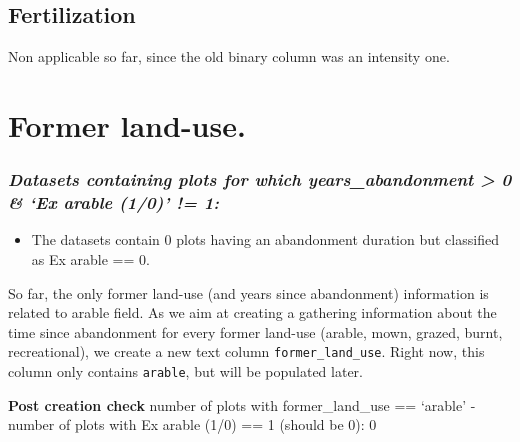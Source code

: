 \documentclass[table]{article}
\newenvironment{Shaded}{\begin{snugshade}}{\end{snugshade}}
\newcommand{\KeywordTok}[1]{\textcolor[rgb]{0.13,0.29,0.53}{\textbf{#1}}}
\newcommand{\DataTypeTok}[1]{\textcolor[rgb]{0.13,0.29,0.53}{#1}}
\newcommand{\DecValTok}[1]{\textcolor[rgb]{0.00,0.00,0.81}{#1}}
\newcommand{\StringTok}[1]{\textcolor[rgb]{0.31,0.60,0.02}{#1}}
\newcommand{\OtherTok}[1]{\textcolor[rgb]{0.56,0.35,0.01}{#1}}
\newcommand{\OperatorTok}[1]{\textcolor[rgb]{0.81,0.36,0.00}{\textbf{#1}}}
\newcommand{\NormalTok}[1]{#1}
\providecommand{\tightlist}{%
  \setlength{\itemsep}{0pt}\setlength{\parskip}{0pt}}
\begin{document}
\subsection{Fertilization}\label{fertilization}

Non applicable so far, since the old binary column was an intensity one.

\section{Former land-use.}\label{former-land-use.}

\subsubsection{\texorpdfstring{\emph{Datasets containing plots for which
years\_abandonment \textgreater{} 0 \& `Ex arable (1/0)' !=
1:}}{Datasets containing plots for which years\_abandonment \textgreater{} 0 \& Ex arable (1/0) != 1:}}\label{datasets-containing-plots-for-which-years_abandonment-0-ex-arable-10-1}

\begin{itemize}
\tightlist
\item
  The datasets contain 0 plots having an abandonment duration but
  classified as Ex arable == 0.
\end{itemize}

So far, the only former land-use (and years since abandonment)
information is related to arable field. As we aim at creating a
gathering information about the time since abandonment for every former
land-use (arable, mown, grazed, burnt, recreational), we create a new
text column \texttt{former\_land\_use}. Right now, this column only
contains \texttt{arable}, but will be populated later.

\begin{Shaded}
\end{Shaded}

\textbf{Post creation check} number of plots with former\_land\_use ==
`arable' - number of plots with Ex arable (1/0) == 1 (should be 0): 0
\end{document}
